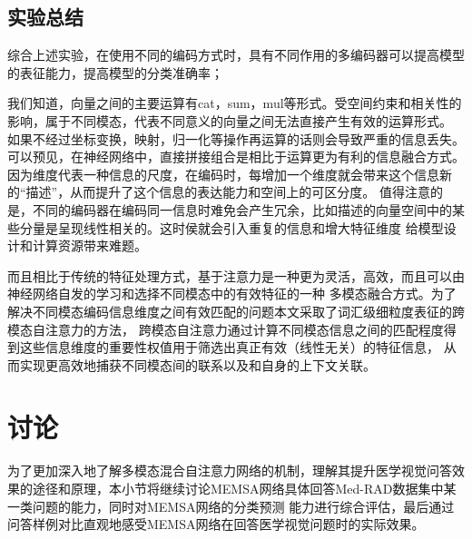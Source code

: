 \subsection{实验总结}
综合上述实验，在使用不同的编码方式时，具有不同作用的多编码器可以提高模型的表征能力，提高模型的分类准确率；

我们知道，向量之间的主要运算有cat，sum，mul等形式。受空间约束和相关性的影响，属于不同模态，代表不同意义的向量之间无法直接产生有效的运算形式。
如果不经过坐标变换，映射，归一化等操作再运算的话则会导致严重的信息丢失。可以预见，在神经网络中，直接拼接组合是相比于运算更为有利的信息融合方式。
因为维度代表一种信息的尺度，在编码时，每增加一个维度就会带来这个信息新的“描述”，从而提升了这个信息的表达能力和空间上的可区分度。
值得注意的是，不同的编码器在编码同一信息时难免会产生冗余，比如描述的向量空间中的某些分量是呈现线性相关的。这时侯就会引入重复的信息和增大特征维度
给模型设计和计算资源带来难题。

而且相比于传统的特征处理方式，基于注意力是一种更为灵活，高效，而且可以由神经网络自发的学习和选择不同模态中的有效特征的一种
多模态融合方式。为了解决不同模态编码信息维度之间有效匹配的问题本文采取了词汇级细粒度表征的跨模态自注意力的方法，
跨模态自注意力通过计算不同模态信息之间的匹配程度得到这些信息维度的重要性权值用于筛选出真正有效（线性无关）的特征信息，
从而实现更高效地捕获不同模态间的联系以及和自身的上下文关联。

\section{讨论}
为了更加深入地了解多模态混合自注意力网络的机制，理解其提升医学视觉问答效果的途径和原理，本小节将继续讨论MEMSA网络具体回答Med-RAD数据集中某一类问题的能力，同时对MEMSA网络的分类预测
能力进行综合评估，最后通过问答样例对比直观地感受MEMSA网络在回答医学视觉问题时的实际效果。
